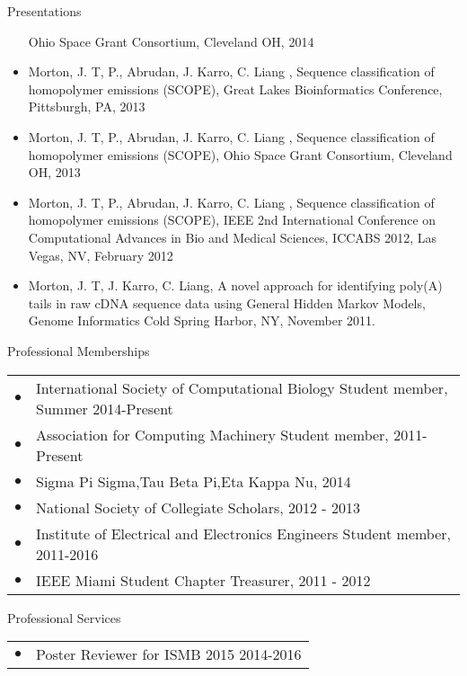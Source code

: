 \documentclass{resume} %
\begin{document}
\begin{rSection}{Presentations}
\begin{itemize}
                Ohio Space Grant Consortium, Cleveland OH, 2014
    \item   Morton, J. T, P., Abrudan, J. Karro, C. Liang , Sequence classification of homopolymer emissions
                (SCOPE), Great Lakes Bioinformatics Conference, Pittsburgh, PA, 2013
    \item   Morton, J. T, P., Abrudan, J. Karro, C. Liang , Sequence classification of homopolymer emissions
                (SCOPE), Ohio Space Grant Consortium, Cleveland OH, 2013
    \item   Morton, J. T, P., Abrudan, J. Karro, C. Liang , Sequence classification of homopolymer emissions
                (SCOPE), IEEE 2nd International Conference on Computational Advances in Bio and
                Medical Sciences, ICCABS 2012, Las Vegas, NV, February 2012
    \item   Morton, J. T, J. Karro, C. Liang, A novel approach for identifying poly(A) tails in
                raw cDNA sequence data using General Hidden Markov Models, Genome Informatics
                Cold Spring Harbor, NY, November 2011.\\[5 mm]
  \end{itemize}
\end{rSection}

\begin{rSection}{Professional Memberships}
  \begin{tabular}{ll}
    $\bullet$ & International Society of Computational Biology Student member, Summer 2014-Present\\
    $\bullet$ & Association for Computing Machinery Student member, 2011-Present \\
    $\bullet$ & Sigma Pi Sigma,Tau Beta Pi,Eta Kappa Nu, 2014 \\
    $\bullet$ & National Society of Collegiate Scholars, 2012 - 2013\\
    $\bullet$ & Institute of Electrical and Electronics Engineers Student member, 2011-2016 \\
    $\bullet$ & IEEE Miami Student Chapter Treasurer, 2011 - 2012\\
  \end{tabular}
\end{rSection}

\begin{rSection}{Professional Services}
  \begin{tabular}{ll}
    $\bullet$ & Poster Reviewer for ISMB 2015  2014-2016
  \end{tabular}
\end{rSection}
\end{document}
